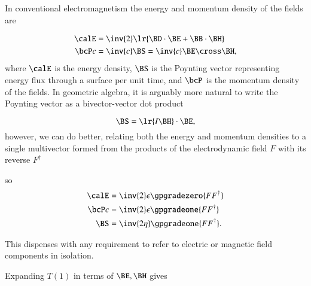 %
%

In conventional electromagnetism the energy and momentum density of the fields are

\begin{dmath}\label{eqn:poyntingF:20}
\begin{aligned}
\calE &= \inv{2} \lr{ \BD \cdot \BE + \BB \cdot \BH } \\
\bcP c &= \inv{c} \BS = \inv{c} \BE \cross \BH,
\end{aligned}
\end{dmath}
where \( \calE \) is the energy density, \( \BS \) is the Poynting vector representing energy flux through a surface per unit time, and \( \bcP \) is the momentum density of the fields.
In geometric algebra, it is arguably more natural to write the Poynting vector as a bivector-vector dot product

\begin{dmath}\label{eqn:poyntingF:1100}
\BS = \lr{ I \BH } \cdot \BE,
\end{dmath}
however, we can do better, relating both the
energy and momentum densities to a single multivector formed from the products of the electrodynamic field \( F \) with its reverse \( F^\dagger \)

so
\begin{dmath}\label{eqn:poyntingF:40}
\begin{aligned}
\calE &= \inv{2} \epsilon \gpgradezero{ F F^\dagger } \\
\bcP c &= \inv{2} \epsilon \gpgradeone{ F F^\dagger } \\
\BS &= \inv{2 \eta} \gpgradeone{ F F^\dagger }.
\end{aligned}
\end{dmath}

This dispenses with any requirement to refer to electric or magnetic field components in isolation.

Expanding \( T(1) \) in terms of \( \BE, \BH \) gives

